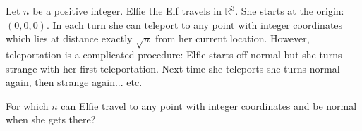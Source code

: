 Let $n$ be a positive integer. Elfie the Elf travels in $\mathbb{R}^3$. She starts at the origin: $(0,0,0)$. In each turn she can teleport to any point with integer coordinates which lies at distance exactly $\sqrt{n}$ from her current location. However, teleportation is a complicated procedure: Elfie starts off normal but she turns strange with her first teleportation. Next time she teleports she turns normal again, then strange again... etc.

For which $n$ can Elfie travel to any point with integer coordinates and be normal when she gets there?